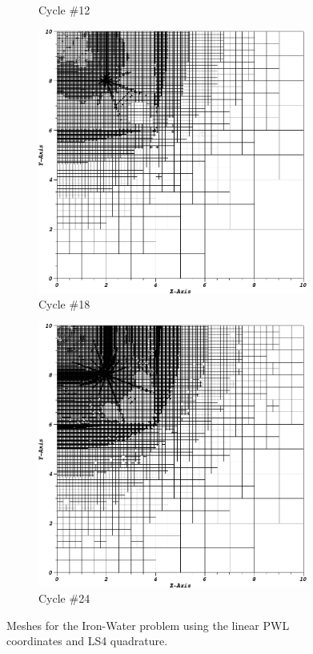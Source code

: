 \begin{figure}
\begin{subfigure}[b]{0.485\textwidth}
		\caption{Cycle \#12}
	\end{subfigure}
	\vfill
	\begin{subfigure}[b]{0.485\textwidth}
		\centering
		\includegraphics[width=0.975\textwidth]{figures/sec_DSA/IW_PWLD1_LS4_cyc18.png}
		\caption{Cycle \#18}
	\end{subfigure}
	\hfill
	\begin{subfigure}[b]{0.485\textwidth}
		\centering
		\includegraphics[width=0.975\textwidth]{figures/sec_DSA/IW_PWLD1_LS4_cyc24.png}
		\caption{Cycle \#24}
	\end{subfigure}
\caption{Meshes for the Iron-Water problem using the linear PWL coordinates and LS4 quadrature.}
\label{fig::IW_PWLD1_LS4_meshes}
\end{figure}


